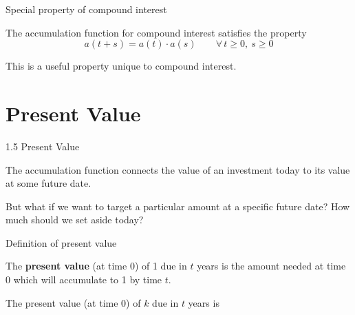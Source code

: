\documentclass{beamer}
\begin{document}
\begin{frame}{Special property of compound interest}

The accumulation function for compound interest satisfies the property
\[
a(t+s) = a(t) \cdot a(s) \qquad \forall\, t \ge 0,\ s \ge 0
\]

\begin{center}
\end{center}

\vfill
This is a useful property unique to compound interest.

\end{frame}

\section{Present Value}

\begin{frame}{1.5 Present Value}

The accumulation function connects the value of an investment today to its value at some future date.

\begin{center}
\end{center}

But what if we want to target a particular amount at a specific future date? How much should we set aside today?

\end{frame}

\begin{frame}{Definition of present value}

\begin{defn}
The \textbf{present value} (at time 0) of 1 due in $t$ years is the amount needed at time 0 which will accumulate to 1 by time $t$.
\end{defn}

\begin{center}
\end{center}

The present value (at time 0) of $k$ due in $t$ years is

\vfill
\end{frame}
\end{document}
